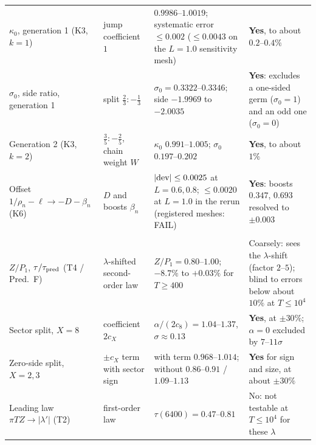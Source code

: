 \begin{tabular}{>{\raggedright\arraybackslash}p{3.6cm}>{\raggedright\arraybackslash}p{3.3cm}>{\raggedright\arraybackslash}p{3.9cm}>{\raggedright\arraybackslash}p{4.6cm}}
$\kappa_0$, generation 1 (K3, $k=1$) & jump coefficient $1$ & $0.9986$--$1.0019$; systematic error $\le0.002$ ($\le0.0043$ on the $L=1.0$ sensitivity mesh) & \textbf{Yes}, to about $0.2$--$0.4\%$ \\
$\sigma_0$, side ratio, generation 1 & split $\frac23:-\frac13$ & $\sigma_0=0.3322$--$0.3346$; side $-1.9969$ to $-2.0035$ & \textbf{Yes}: excludes a one-sided germ ($\sigma_0=1$) and an odd one ($\sigma_0=0$) \\
Generation 2 (K3, $k=2$) & $\frac35:-\frac25$, chain weight $W$ & $\kappa_0$ $0.991$--$1.005$; $\sigma_0$ $0.197$--$0.202$ & \textbf{Yes}, to about $1\%$ \\
Offset $1/\rho_n-\ell\to-D-\beta_n$ (K6) & $D$ and boosts $\beta_n$ & $|{\rm dev}|\le0.0025$ at $L=0.6,0.8$; $\le0.0020$ at $L=1.0$ in the rerun (registered meshes: FAIL) & \textbf{Yes}: boosts $0.347$, $0.693$ resolved to $\pm0.003$ \\
\midrule
\multicolumn{4}{l}{\emph{Tail law}}\\
$Z/P_1$, $\tau/\tau_{\rm pred}$ (T4 / Pred.~F) & $\lambda$-shifted second-order law & $Z/P_1=0.80$--$1.00$; $-8.7\%$ to $+0.03\%$ for $T\ge400$ & Coarsely: sees the $\lambda$-shift (factor $2$--$5$); blind to errors below about $10\%$ at $T\le10^4$ \\
Sector split, $X=8$ & coefficient $2c_X$ & $\alpha/(2c_8)=1.04$--$1.37$, $\sigma\approx0.13$ & \textbf{Yes}, at $\pm30\%$; $\alpha=0$ excluded by $7$--$11\sigma$ \\
Zero-side split, $X=2,3$ & $\pm c_X$ term with sector sign & with term $0.968$--$1.014$; without $0.86$--$0.91$ / $1.09$--$1.13$ & \textbf{Yes} for sign and size, at about $\pm30\%$ \\
Leading law $\pi TZ\to|\lambda'|$ (T2) & first-order law & $\tau(6400)=0.47$--$0.81$ & No: not testable at $T\le10^4$ for these $\lambda$ \\
\bottomrule
\end{tabular}
